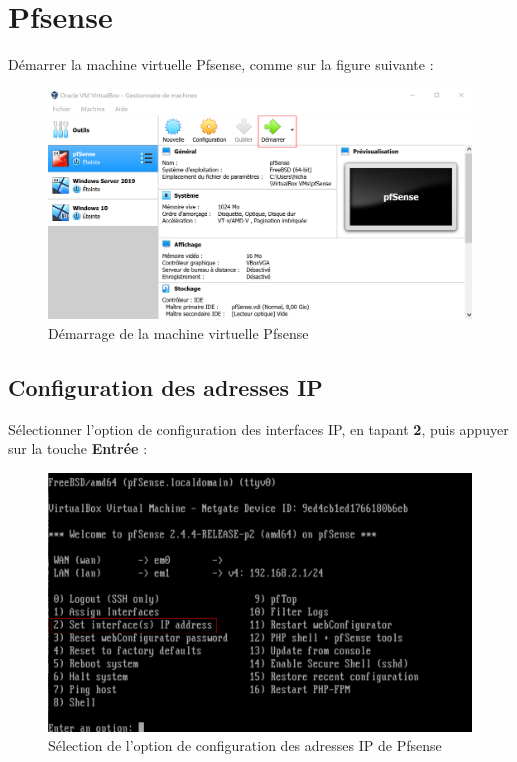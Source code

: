 \section{Pfsense}

Démarrer la machine virtuelle Pfsense, comme sur la figure suivante :
\begin{figure}[h!]
	\begin{center}
		\includegraphics[scale=0.7]{Pfsense_Screeshots/14.png}
		\caption{Démarrage de la machine virtuelle Pfsense}
		\label{Pfsense_Screeshots/14}
	\end{center}
\end{figure}
\FloatBarrier 

\newpage
\subsection{Configuration des adresses IP}

Sélectionner l'option de configuration des interfaces IP, en tapant \textbf{2}, puis appuyer sur la touche \textbf{Entrée} :
\begin{figure}[h!]
	\begin{center}
		\includegraphics[scale=0.5]{Pfsense_Screeshots/15.png}
		\caption{Sélection de l'option de configuration des adresses IP de Pfsense}
		\label{Pfsense_Screeshots/15}
	\end{center}
\end{figure}
\FloatBarrier    

